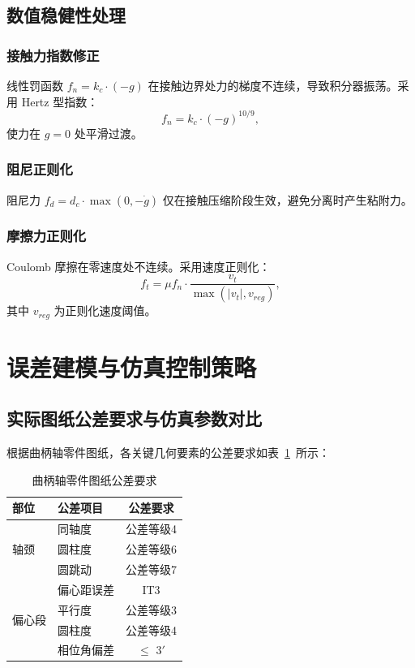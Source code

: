 \documentclass[12pt]{ctexart}
\begin{document}
\subsection{数值稳健性处理}

\subsubsection{接触力指数修正}
线性罚函数 $f_n = k_c \cdot (-g)$ 在接触边界处力的梯度不连续，导致积分器振荡。采用 Hertz 型指数：
\begin{equation}
f_n = k_c \cdot (-g)^{10/9},
\end{equation}
使力在 $g=0$ 处平滑过渡。

\subsubsection{阻尼正则化}
阻尼力 $f_d = d_c \cdot \max(0, -\dot g)$ 仅在接触压缩阶段生效，避免分离时产生粘附力。

\subsubsection{摩擦力正则化}
Coulomb 摩擦在零速度处不连续。采用速度正则化：
\begin{equation}
f_t = \mu f_n \cdot \frac{v_t}{\max(|v_t|, v_{reg})},
\end{equation}
其中 $v_{reg}$ 为正则化速度阈值。

\section{误差建模与仿真控制策略}

\subsection{实际图纸公差要求与仿真参数对比}

根据曲柄轴零件图纸，各关键几何要素的公差要求如表~\ref{tab:tolerance-spec}~所示：

\begin{table}[htbp]
\centering
\small
\caption{曲柄轴零件图纸公差要求}
\label{tab:tolerance-spec}
\begin{tabular}{llc}
\toprule
部位 & 公差项目 & 公差要求 \\
\midrule
\multirow{3}{*}{轴颈}
 & 同轴度 & 公差等级4 \\
 & 圆柱度 & 公差等级6 \\
 & 圆跳动 & 公差等级7 \\
\midrule
\multirow{4}{*}{偏心段}
 & 偏心距误差 & IT3 \\
 & 平行度 & 公差等级3 \\
 & 圆柱度 & 公差等级4 \\
 & 相位角偏差 & $\le$ 3$'$ \\
\bottomrule
\end{tabular}
\end{table}
\end{document}
